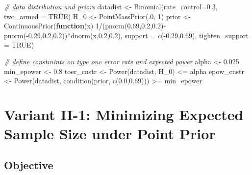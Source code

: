 \documentclass[
]{book}
\newenvironment{Shaded}{\begin{snugshade}}{\end{snugshade}}
\newcommand{\AttributeTok}[1]{\textcolor[rgb]{0.77,0.63,0.00}{#1}}
\newcommand{\CommentTok}[1]{\textcolor[rgb]{0.56,0.35,0.01}{\textit{#1}}}
\newcommand{\ConstantTok}[1]{\textcolor[rgb]{0.00,0.00,0.00}{#1}}
\newcommand{\ControlFlowTok}[1]{\textcolor[rgb]{0.13,0.29,0.53}{\textbf{#1}}}
\newcommand{\DecValTok}[1]{\textcolor[rgb]{0.00,0.00,0.81}{#1}}
\newcommand{\FloatTok}[1]{\textcolor[rgb]{0.00,0.00,0.81}{#1}}
\newcommand{\FunctionTok}[1]{\textcolor[rgb]{0.00,0.00,0.00}{#1}}
\newcommand{\NormalTok}[1]{#1}
\newcommand{\OtherTok}[1]{\textcolor[rgb]{0.56,0.35,0.01}{#1}}
\newcommand{\SpecialCharTok}[1]{\textcolor[rgb]{0.00,0.00,0.00}{#1}}
\begin{document}
\begin{Shaded}
\begin{Highlighting}[]
\CommentTok{\# data distribution and priors}
\NormalTok{datadist   }\OtherTok{\textless{}{-}} \FunctionTok{Binomial}\NormalTok{(}\AttributeTok{rate\_control=}\FloatTok{0.3}\NormalTok{, }\AttributeTok{two\_armed =} \ConstantTok{TRUE}\NormalTok{)}
\NormalTok{H\_0        }\OtherTok{\textless{}{-}} \FunctionTok{PointMassPrior}\NormalTok{(.}\DecValTok{0}\NormalTok{, }\DecValTok{1}\NormalTok{)}
\NormalTok{prior      }\OtherTok{\textless{}{-}} \FunctionTok{ContinuousPrior}\NormalTok{(}\ControlFlowTok{function}\NormalTok{(x) }\DecValTok{1}\SpecialCharTok{/}\NormalTok{(}\FunctionTok{pnorm}\NormalTok{(}\FloatTok{0.69}\NormalTok{,}\FloatTok{0.2}\NormalTok{,}\FloatTok{0.2}\NormalTok{)}\SpecialCharTok{{-}}\FunctionTok{pnorm}\NormalTok{(}\SpecialCharTok{{-}}\FloatTok{0.29}\NormalTok{,}\FloatTok{0.2}\NormalTok{,}\FloatTok{0.2}\NormalTok{))}\SpecialCharTok{*}\FunctionTok{dnorm}\NormalTok{(x,}\FloatTok{0.2}\NormalTok{,}\FloatTok{0.2}\NormalTok{),}
                              \AttributeTok{support =} \FunctionTok{c}\NormalTok{(}\SpecialCharTok{{-}}\FloatTok{0.29}\NormalTok{,}\FloatTok{0.69}\NormalTok{),}
                              \AttributeTok{tighten\_support =} \ConstantTok{TRUE}\NormalTok{)}

\CommentTok{\# define constraints on type one error rate and expected power}
\NormalTok{alpha      }\OtherTok{\textless{}{-}} \FloatTok{0.025}
\NormalTok{min\_epower }\OtherTok{\textless{}{-}} \FloatTok{0.8}
\NormalTok{toer\_cnstr }\OtherTok{\textless{}{-}} \FunctionTok{Power}\NormalTok{(datadist, H\_0) }\SpecialCharTok{\textless{}=}\NormalTok{ alpha}
\NormalTok{epow\_cnstr }\OtherTok{\textless{}{-}} \FunctionTok{Power}\NormalTok{(datadist, }\FunctionTok{condition}\NormalTok{(prior, }\FunctionTok{c}\NormalTok{(}\FloatTok{0.0}\NormalTok{,}\FloatTok{0.69}\NormalTok{))) }\SpecialCharTok{\textgreater{}=}\NormalTok{ min\_epower}
\end{Highlighting}
\end{Shaded}

\hypertarget{variantVII-1}{%
\section{Variant II-1: Minimizing Expected Sample Size under Point Prior}\label{variantVII-1}}

\hypertarget{objective-17}{%
\subsection{Objective}\label{objective-17}}
\end{document}
